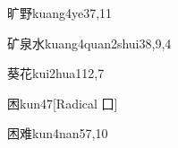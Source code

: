\begin{verbete}{旷野}{kuang4ye3}{7,11}
\end{verbete}

\begin{verbete}{矿泉水}{kuang4quan2shui3}{8,9,4}
\end{verbete}

\begin{verbete}{葵花}{kui2hua1}{12,7}
\end{verbete}

\begin{verbete}{困}{kun4}{7}[Radical ⼞]
\end{verbete}

\begin{verbete}{困难}{kun4nan5}{7,10}
\end{verbete}

